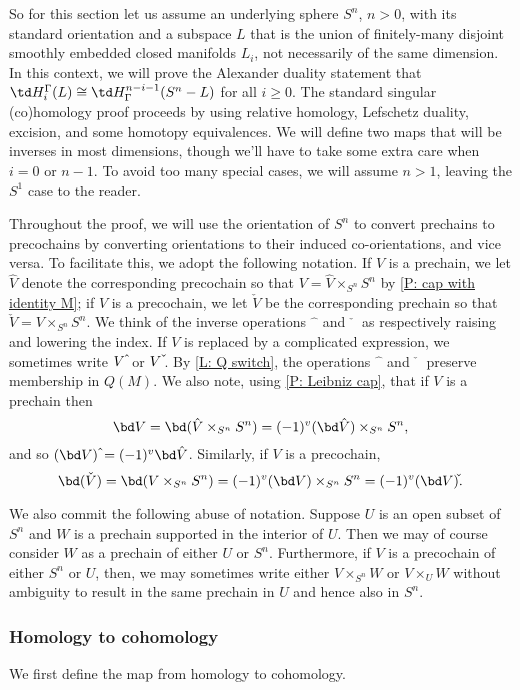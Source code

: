 \begin{example}
So for this section let us assume an underlying sphere $S^n$, $n>0$, with its standard orientation and a subspace $L$ that is the union of finitely-many disjoint smoothly embedded closed manifolds $L_i$, not necessarily of the same dimension.
In this context, we will prove the Alexander duality statement that $\td H_i^\Gamma(L) \cong \td H^{n-i-1}_\Gamma(S^n-L)$ for all $i \geq 0$.
The standard singular (co)homology proof proceeds by using relative homology, Lefschetz duality, excision, and some homotopy equivalences. We will define two maps that will be inverses in most dimensions, though we'll have to take some extra care when $i=0$ or $n-1$.
To avoid too many special cases, we will assume $n>1$, leaving the $S^1$ case to the reader.


Throughout the proof, we will use the orientation of $S^n$ to convert prechains to precochains by converting orientations to their induced co-orientations, and vice versa.
To facilitate this, we adopt the following notation.
If $V$ is a prechain, we let $\hat V$ denote the corresponding precochain so that $V = \hat V \times_{S^n} S^n$ by \cref{P: cap with identity M}; if $V$ is a precochain, we let $\check V$ be the corresponding prechain so that $\check V = V \times_{S^n} S^n$.
We think of the inverse operations $\hat{\phantom{a}}$ and $\check{\phantom{a}}$ as respectively raising and lowering the index.
If $V$ is replaced by a complicated expression, we sometimes write $V\,\hat{\vrule height1.3ex width0pt}$ or $V\,\check{\vrule height1.3ex width0pt}$.
By \cref{L: Q switch}, the operations $\hat{\phantom{a}}$ and $\check{\phantom{a}}$ preserve membership in $Q(M)$.
We also note, using \cref{P: Leibniz cap}, that if $V$ is a prechain then
 $$\bd V = \bd(\hat V \times_{S^n} S^n) = (-1)^{v} (\bd \hat V) \times_{S^n} S^n,$$
and so $(\bd V)\,\hat{\vrule height1.3ex width0pt} = (-1)^{v} \bd \hat V$.
Similarly, if $V$ is a precochain,  $$\bd(\check V) = \bd(V \times_{S^n} S^n) = (-1)^{v} (\bd V) \times_{S^n} S^n = (-1)^v (\bd V)\check{\vrule height1.3ex width0pt}.$$

We also commit the following abuse of notation.
Suppose $U$ is an open subset of $S^n$ and $W$ is a prechain supported in the interior of $U$.
Then we may of course consider $W$ as a prechain of either $U$ or $S^n$.
Furthermore, if $V$ is a precochain of either $S^n$ or $U$, then, we may sometimes write either $V \times_{S^n} W$ or $V \times_U W$ without ambiguity to result in the same prechain in $U$ and hence also in $S^n$.


\subsubsection{Homology to cohomology} We first define the map from homology to cohomology.


\end{example}
